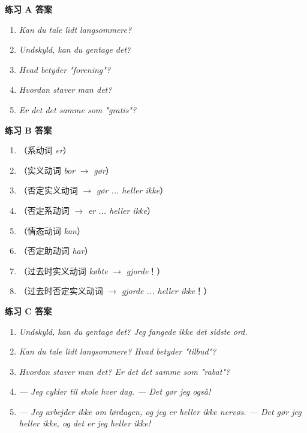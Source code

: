 \begin{answerbox}
\textbf{练习 A 答案}
\begin{enumerate}
  \item \textit{Kan du tale lidt langsommere?}
  \item \textit{Undskyld, kan du gentage det?}
  \item \textit{Hvad betyder "forening"?}
  \item \textit{Hvordan staver man det?}
  \item \textit{Er det det samme som "gratis"?}
\end{enumerate}

\textbf{练习 B 答案}
\begin{enumerate}
  \item {}（系动词 \textit{er}）
  \item {}（实义动词 \textit{bor} $\rightarrow$ \textit{gør}）
  \item {}（否定实义动词 $\rightarrow$ \textit{gør ... heller ikke}）
  \item {}（否定系动词 $\rightarrow$ \textit{er ... heller ikke}）
  \item {}（情态动词 \textit{kan}）
  \item {}（否定助动词 \textit{har}）
  \item {}（过去时实义动词 \textit{købte} $\rightarrow$ \textit{gjorde}！）
  \item {}（过去时否定实义动词 $\rightarrow$ \textit{gjorde ... heller ikke}！）
\end{enumerate}

\textbf{练习 C 答案}
\begin{enumerate}
  \item \textit{Undskyld, kan du gentage det? Jeg fangede ikke det sidste ord.}
  \item \textit{Kan du tale lidt langsommere? Hvad betyder "tilbud"?}
  \item \textit{Hvordan staver man det? Er det det samme som "rabat"?}
  \item \textit{--- Jeg cykler til skole hver dag. --- Det gør jeg også!}
  \item \textit{--- Jeg arbejder ikke om lørdagen, og jeg er heller ikke nervøs. --- Det gør jeg heller ikke, og det er jeg heller ikke!}
\end{enumerate}


\end{answerbox}
